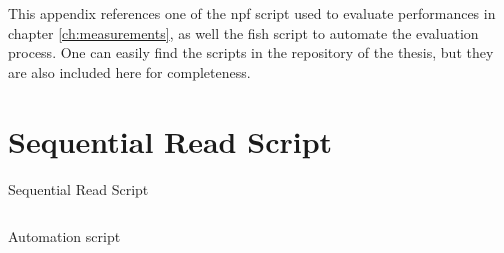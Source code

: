 This appendix references one of the \acrshort{npf} script used to evaluate performances in chapter \ref{ch:measurements}, as well the \acrshort{fish} script to automate the evaluation process. One can easily find the scripts in the repository of the thesis, but they are also included here for completeness.


\section*{Sequential Read Script}
\begin{tbox}{Sequential Read Script}
\label{lst:npf-read}
\inputminted[fontsize=\small,breaklines,breakanywhere=true,linenos=true,style=default]{text}{../measurements/npf/experiments/bs-4M/read.npf}
\end{tbox}

\begin{tbox}{Automation script}
    \label{lst:run-bs-exp}
    \inputminted[fontsize=\small,breaklines,breakanywhere=true,linenos=true,style=default]{fish}{../measurements/npf/run_bs_exp.fish}
\end{tbox}